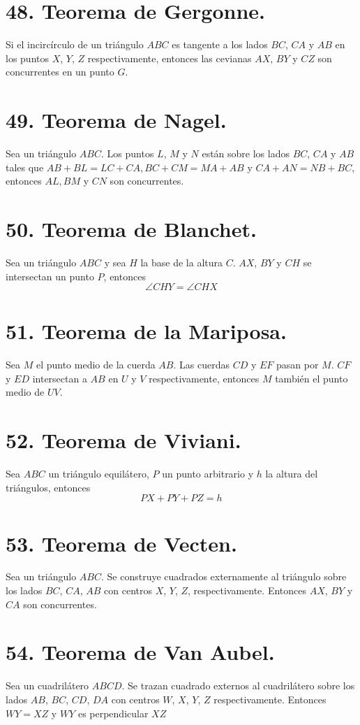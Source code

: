 \documentclass[12pt,a4paper, oneside]{book}
\begin{document}
\section{48. Teorema de Gergonne.}
Si el incircírculo de un triángulo $ABC$ es tangente a los lados $BC$, $CA$ y $AB$ en los puntos $X$, $Y$, $Z$ respectivamente, entonces las cevianas  $AX$, $BY$ y $CZ$ son concurrentes en un punto $G.$
\section{49. Teorema de Nagel.}
Sea un triángulo $ABC$. Los puntos $L$, $M$ y $N$ están sobre los lados $BC$, $CA$ y $AB$ tales que $AB + BL = LC + CA, BC + CM= MA + AB$ y $CA + AN= NB + BC$, entonces $AL, BM$ y $CN$ son concurrentes.
\section{50. Teorema de Blanchet.}
Sea un triángulo $ABC$ y sea $H$ la base de la altura $C$. $AX$, $BY$ y $CH$ se intersectan un punto $P$, entonces $$\angle CHY = \angle CHX$$
\section{51. Teorema de la Mariposa.}
Sea $M$ el punto medio de la cuerda $AB$. Las cuerdas $CD$ y $EF$ pasan por $M$. $CF$ y $ED$ intersectan a $AB$ en $U$ y $V$ respectivamente, entonces $M$ también el punto medio de $UV$.
\section{52. Teorema de Viviani.}
Sea $ABC$ un triángulo equilátero, $P$ un punto arbitrario y $h$ la altura del triángulos, entonces $$PX + PY +PZ = h$$
\section{53. Teorema de Vecten.}
Sea un triángulo $ABC$. Se construye cuadrados externamente al triángulo sobre los lados $BC$, $CA$, $AB$ con centros $X$, $Y$, $Z$, respectivamente. Entonces $AX$, $BY$ y $CA$ son concurrentes.
\section{54. Teorema de Van Aubel.}
Sea un cuadrilátero $ABCD$. Se trazan cuadrado externos al cuadrilátero sobre los lados $AB$, $BC$, $CD$, $DA$ con centros $W$, $X$, $Y$, $Z$ respectivamente. Entonces $WY= XZ$ y $WY$ es perpendicular $XZ$
\end{document}
